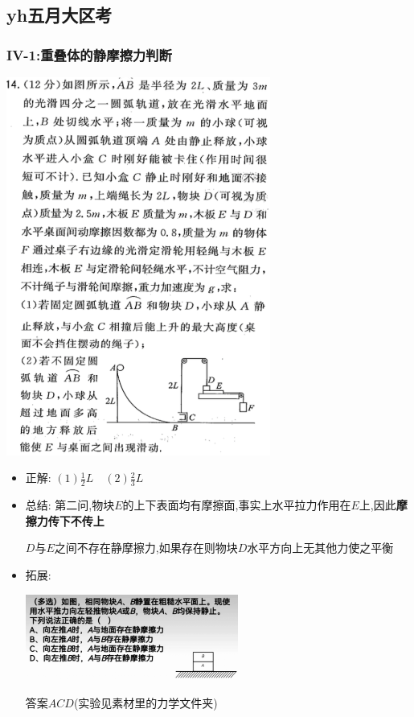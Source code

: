 \documentclass{article}
\begin{document}
\vspace{2em}

\subsection{yh五月大区考}
\subsubsection{IV-1:重叠体的静摩擦力判断}
\includegraphics[width=0.65\textwidth,keepaspectratio]{./pictures/3.6-1.png}

\begin{itemize}
    \item 正解: $(1) \frac{1}{2}L \quad (2) \frac{2}{3}L$
    \item 总结: 第二问,物块$E$的上下表面均有摩擦面,事实上水平拉力作用在$E$上,因此\textbf{摩擦力传下不传上}

          \hspace{2.6em}$D$与$E$之间不存在静摩擦力,如果存在则物块$D$水平方向上无其他力使之平衡

    \item 拓展:

          \includegraphics[width=0.55\textwidth,keepaspectratio]{./pictures/3.6-3.png}

          \hspace{2.6em} 答案$ACD$(实验见素材里的力学文件夹)

\end{itemize}
\end{document}
